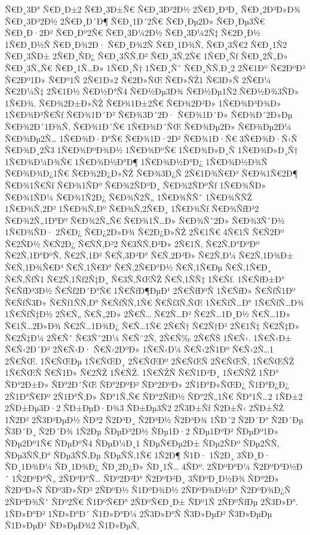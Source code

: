 {Ñ€Ð¸3Ð°
Ñ€Ð¸Ð±2
Ñ€Ð¸3Ð±Ñ€
Ñ€Ð¸3Ð²2Ð½
2Ñ€Ð¸Ð³Ð¸
Ñ€Ð¸2Ð³Ð»Ð¾
Ñ€Ð¸3Ð³2Ð½
2Ñ€Ð¸Ð´Ð¶
Ñ€Ð¸1Ð´2Ñ€
Ñ€Ð¸Ðµ2Ð»
Ñ€Ð¸Ðµ3Ñ€
Ñ€Ð¸Ð·2Ð²
Ñ€Ð¸Ðº2Ñ€
Ñ€Ð¸3Ð¼2Ð½
Ñ€Ð¸3Ð¼2Ñ‡
Ñ€2Ð¸Ð½
1Ñ€Ð¸Ð½Ñ
Ñ€Ð¸Ð¾2Ð·
Ñ€Ð¸Ð¾2Ñ
Ñ€Ð¸1Ð¾Ñ‚
Ñ€Ð¸3Ñ€2
Ñ€Ð¸1Ñ2
Ñ€Ð¸3ÑÐ±
2Ñ€Ð¸ÑÐ¿
Ñ€Ð¸3ÑÑ‚Ð²
Ñ€Ð¸3Ñ‚2Ñ€
1Ñ€Ð¸Ñƒ
Ñ€Ð¸2Ñ„Ð»
Ñ€Ð¸3Ñ„Ñ€
Ñ€Ð¸1Ñ…Ð»
1Ñ€Ð¸Ñ†
1Ñ€Ð¸Ñˆ
Ñ€Ð¸ÑÑ‚Ð¸2
2Ñ€1Ðº
Ñ€2ÐºÐ²
Ñ€2Ðº1Ð»
Ñ€Ðº1Ñ
2Ñ€1Ð»2
Ñ€2Ð»ÑŒ
Ñ€Ð»ÑŽ1
Ñ€3Ð»Ñ
2Ñ€Ð¼
Ñ€2Ð¼Ñ‡
2Ñ€1Ð½
Ñ€Ð½Ð°Ñ4
Ñ€Ð½Ðµ3Ð¾
Ñ€Ð½Ðµ1Ñ2
Ñ€Ð½Ð¾3ÑÐ»
1Ñ€Ð¾.
Ñ€Ð¾2Ð±Ð»ÑŽ
Ñ€Ð¾1Ð±2Ñ€
Ñ€Ð¾2Ð²Ð»
1Ñ€Ð¾Ð³Ð¾Ð»
1Ñ€Ð¾Ð³Ñ€Ñƒ
Ñ€Ð¾1Ð´Ð²
Ñ€Ð¾3Ð´2Ð·
Ñ€Ð¾1Ð´Ð»
Ñ€Ð¾Ð´2Ð»Ðµ
Ñ€Ð¾2Ð´1Ð¾Ñ‚
Ñ€Ð¾1Ð´Ñ€
1Ñ€Ð¾Ð´ÑŒ
Ñ€Ð¾Ðµ2Ð»
Ñ€Ð¾Ðµ2Ð¼
Ñ€Ð¾Ðµ2Ñ…
1Ñ€Ð¾Ð·Ð°Ñ€
Ñ€Ð¾1Ð·2Ð²
Ñ€Ð¾1Ð·Ñ€
3Ñ€Ð¾Ð·Ñ‹Ñ
Ñ€Ð¾Ð¸2Ñ3
1Ñ€Ð¾ÐºÐ¾Ð½
1Ñ€Ð¾ÐºÑ€
1Ñ€Ð¾Ð»Ð¸Ñ
1Ñ€Ð¾Ð»Ð¸Ñ†
1Ñ€Ð¾Ð¼Ð¾Ñ€
1Ñ€Ð¾Ð½Ð°Ð¶
1Ñ€Ð¾Ð½Ð°Ð¿
1Ñ€Ð¾Ð½Ð¾Ñ
Ñ€Ð¾Ð¾Ð¿1Ñ€
Ñ€Ð¾2Ð¿Ð»ÑŽ
Ñ€Ð¾3Ð¿Ñ
2Ñ€1Ð¾Ñ€Ð³
Ñ€Ð¾1Ñ€2Ð¶
Ñ€Ð¾1Ñ€Ñƒ
Ñ€Ð¾1ÑÐº
Ñ€Ð¾2ÑÐºÐ¸
Ñ€Ð¾2ÑÐºÑƒ
1Ñ€Ð¾ÑÐ»
Ñ€Ð¾1ÑÐ¼
Ñ€Ð¾1Ñ2Ð¿
Ñ€Ð¾Ñ2Ñ„
1Ñ€Ð¾ÑÑˆ
1Ñ€Ð¾ÑÑŽ
1Ñ€Ð¾Ñ‚2Ð²
1Ñ€Ð¾Ñ‚Ðº
Ñ€Ð¾Ñ‚2Ñ€Ð¸
1Ñ€Ð¾Ñƒ
Ñ€Ð¾ÑƒÐ³2
Ñ€Ð¾2Ñ„1Ð°Ðº
Ñ€Ð¾2Ñ„Ñ€
Ñ€Ð¾1Ñ…Ð»
Ñ€Ð¾Ñˆ2Ð»
Ñ€Ð¾3ÑˆÐ½
1Ñ€Ð¾ÑÐ·
2Ñ€Ð¿
Ñ€Ð¿2Ð»Ð¾
Ñ€2Ð¿Ð»ÑŽ
2Ñ€1Ñ€
4Ñ€1Ñ
Ñ€Ñ2Ðº
Ñ€2ÑÐ½
Ñ€Ñ2Ð¿
Ñ€ÑÑ‚Ð²2
Ñ€3ÑÑ‚Ð²Ð»
2Ñ€1Ñ‚
Ñ€2Ñ‚Ð°ÐºÐº
Ñ€2Ñ‚1Ð°ÐºÑ‚
Ñ€2Ñ‚1Ð²
Ñ€Ñ‚3Ð²Ð°
Ñ€Ñ‚2Ð²Ð»
Ñ€2Ñ‚Ð¼
Ñ€2Ñ‚1Ð¾Ð±
Ñ€Ñ‚1Ð¾Ñ€Ð³
Ñ€Ñ‚1Ñ€Ð°
Ñ€Ñ‚2Ñ€Ð°Ð½
Ñ€Ñ‚1Ñ€Ðµ
Ñ€Ñ‚1Ñ€Ð¸
Ñ€Ñ‚ÑƒÑ1
Ñ€2Ñ‚1Ñƒ2Ñ‡Ð¸
Ñ€3Ñ‚ÑŒÑŽ
Ñ€Ñ‚1ÑÑ‡
1Ñ€Ñƒ.
1Ñ€ÑƒÐ±Ð°
Ñ€ÑƒÐ³3Ð½
Ñ€Ñƒ2Ð´Ð°Ñ€
1Ñ€ÑƒÐ¶ÐµÐ¹
2Ñ€ÑƒÐºÑ
1Ñ€ÑƒÐ»
Ñ€ÑƒÑ1Ðº
Ñ€ÑƒÑ3Ð»
Ñ€Ñƒ1ÑÑ‚Ð°
Ñ€ÑƒÑÑ‚1Ñ€
Ñ€Ñƒ3Ñ‚ÑŒ
1Ñ€ÑƒÑ…Ð°
1Ñ€ÑƒÑ…Ð¾
1Ñ€ÑƒÑ‡Ð½
2Ñ€Ñ„
Ñ€Ñ„2Ð»
2Ñ€Ñ…
Ñ€2Ñ…Ð²
Ñ€2Ñ…1Ð¸Ð½
Ñ€Ñ…1Ð»
Ñ€1Ñ…2Ð»Ð¾
Ñ€2Ñ…1Ð¾Ð¿
Ñ€Ñ…1Ñ€
2Ñ€Ñ†
Ñ€2Ñ†Ð²
2Ñ€1Ñ‡
Ñ€2Ñ‡Ð»
Ñ€2Ñ‡Ð¼
2Ñ€Ñˆ
Ñ€3Ñˆ2Ð¼
Ñ€Ñˆ2Ñ‚
2Ñ€Ñ‰
2Ñ€ÑŠ
1Ñ€Ñ‹.
1Ñ€Ñ‹Ð±
Ñ€Ñ‹2Ð´Ð²
2Ñ€Ñ‹Ð·
Ñ€Ñ‹2ÐºÐ»
1Ñ€Ñ‹Ð¼
Ñ€Ñ‹2Ñ1Ðº
Ñ€Ñ‹2Ñ…1
2Ñ€ÑŒ.
1Ñ€ÑŒÐµ
1Ñ€ÑŒÐ¸
2Ñ€ÑŒÐº
2Ñ€ÑŒÑ
2Ñ€ÑŒÑ‚
1Ñ€ÑŒÑŽ
1Ñ€ÑŒÑ
Ñ€Ñ1Ð»
Ñ€2ÑŽ
1Ñ€ÑŽ.
1Ñ€ÑŽÑ
Ñ€Ñ1Ð²Ð¸
1Ñ€ÑÑŽ
1ÑÐ°
ÑÐ°2Ð±Ð»
ÑÐ°2Ð´ÑŒ
ÑÐ°2ÐºÐ²
ÑÐ°2ÐºÐ»
2Ñ1Ð°Ð»ÑŒÐ¿
Ñ1Ð°Ð¿Ð¿
2Ñ1Ð°Ñ€Ðº
2Ñ1Ð°Ñ‚Ð»
ÑÐ°1Ñ‚Ñ€
ÑÐ°2ÑƒÐ½
ÑÐ°2Ñ„1Ñ€
ÑÐ°1Ñ…2
1ÑÐ±2
2ÑÐ±Ðµ3Ð·2
ÑÐ±ÐµÐ·Ð¾3
ÑÐ±Ðµ3Ñ2
2Ñ3Ð±Ñƒ
Ñ2Ð±Ñ‹
2ÑÐ±ÑŽ
1Ñ2Ð²
2Ñ3Ð²ÐµÐ½
ÑÐ³2
Ñ2Ð³Ð¸
Ñ2Ð³Ð½
Ñ2Ð³Ð¾
1ÑÐ´2
Ñ2Ð´Ð°
Ñ2Ð´Ðµ
Ñ3Ð´Ð¸
Ñ2Ð´Ð¾
1Ñ2Ðµ
ÑÐµÐ³2Ð½
ÑÐµ1Ð·2
ÑÐµ1ÐºÐ²
ÑÐµÐº1Ð»
ÑÐµ2Ðº1Ñ€
ÑÐµÐºÑ4
ÑÐµÐ¼Ð¸1
ÑÐµÑ€Ðµ2Ð±
ÑÐµ2ÑÐº
ÑÐµ2ÑÑ‚
ÑÐµ3ÑÑ‚Ð°
ÑÐµ3ÑÑ‚Ðµ
ÑÐµÑÑ‚1Ñ€
1Ñ2Ð¶
Ñ1Ð·
1Ñ2Ð¸
3ÑÐ¸Ð·
ÑÐ¸1Ð¾Ð¼
ÑÐ¸1Ð¾Ð¿
ÑÐ¸2Ð¿Ð»
ÑÐ¸1Ñ…
4ÑÐº.
2ÑÐºÐ°Ð¼
Ñ2ÐºÐ°Ð½Ð´
1Ñ2ÐºÐ°Ñ„
2ÑÐºÐ°Ñ…
ÑÐº2Ð²Ð°
Ñ2ÐºÐ²Ð¸
3ÑÐºÐ¸Ð½Ð¾
ÑÐº2Ð»
Ñ2ÐºÐ»Ñ
ÑÐº3Ð»ÑÐ²
2ÑÐºÐ½
Ñ1ÐºÐ¾Ð½
2ÑÐºÐ¾Ð½Ð°
Ñ2ÐºÐ¾Ð¿Ñ
2ÑÐºÐ¾Ñˆ
ÑÐº2Ñ€
Ñ1ÐºÑ€Ð°
2ÑÐºÑ€Ð¸Ð±
ÑÐº1Ñ
2ÑÐºÑƒÐµ
2Ñ3Ð»Ð°.
1ÑÐ»Ð°Ð²
1ÑÐ»Ð°Ð´
Ñ1Ð»Ð°Ð¼
2Ñ3Ð»Ð°Ñ
Ñ3Ð»ÐµÐ²
Ñ3Ð»ÐµÐµ
Ñ1Ð»ÐµÐ¹
ÑÐ»ÐµÐ¾2
Ñ1Ð»ÐµÑ‚
}
